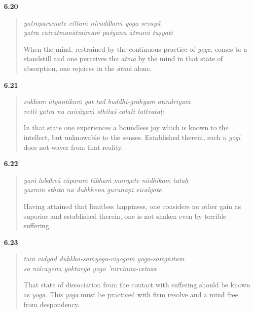 \par\noindent\textbf{6.20}\par
\begin{verse}
\textit{yatroparamate cittaṁ niruddhaṁ yoga-sevayā} \\
\textit{yatra caivātmanātmānaṁ paśyann ātmani tuṣyati}

\noindent When the mind, restrained by the continuous practice of \textit{yoga}, comes to a standstill and one perceives the \textit{ātmā} by the mind in that state of absorption, one rejoices in the \textit{ātmā} alone.
\end{verse}
\par



\par\noindent\textbf{6.21}\par
\begin{verse}
\textit{sukham ātyantikaṁ yat tad buddhi-grāhyam atīndriyam} \\
\textit{vetti yatra na caivāyaṁ sthitaś calati tattvataḥ}

\noindent In that state one experiences a boundless joy which is known to the intellect, but unknowable to the senses. Established therein, such a \textit{yogī} does not waver from that reality.
\end{verse}
\par



\par\noindent\textbf{6.22}\par
\begin{verse}
\textit{yaṁ labdhvā cāparaṁ lābhaṁ manyate nādhikaṁ tataḥ} \\
\textit{yasmin sthito na duḥkhena guruṇāpi vicālyate}

\noindent Having attained that limitless happiness, one considers no other gain as superior and established therein, one is not shaken even by terrible suffering.
\end{verse}
\par



\par\noindent\textbf{6.23}\par
\begin{verse}
\textit{taṁ vidyād duḥkha-saṁyoga-viyogaṁ yoga-saṁjñitam} \\
\textit{sa niścayena yoktavyo yogo ’nirviṇṇa-cetasā}

\noindent That state of dissociation from the contact with suffering should be known as \textit{yoga}. This \textit{yoga} must be practiced with firm resolve and a mind free from despondency.
\end{verse}
\par



